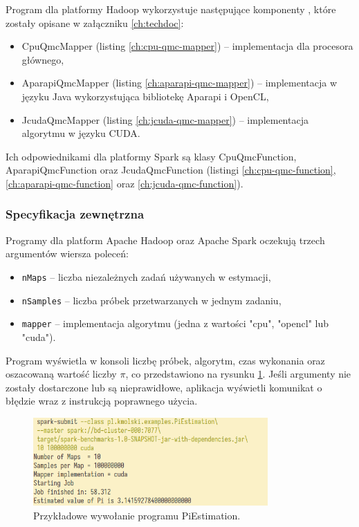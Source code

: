 Program dla platformy Hadoop wykorzystuje następujące komponenty ,
które zostały opisane w załączniku \ref{ch:techdoc}:
\begin{itemize}
	\item CpuQmcMapper (listing \ref{ch:cpu-qmc-mapper}) -- implementacja dla procesora głównego,
	\item AparapiQmcMapper (listing \ref{ch:aparapi-qmc-mapper}) -- implementacja w języku Java wykorzystująca bibliotekę Aparapi i OpenCL,
	\item JcudaQmcMapper (listing \ref{ch:jcuda-qmc-mapper}) -- implementacja algorytmu w języku CUDA.
\end{itemize}

Ich odpowiednikami dla platformy Spark są klasy CpuQmcFunction, AparapiQmcFunction oraz JcudaQmcFunction (listingi \ref{ch:cpu-qmc-function}, \ref{ch:aparapi-qmc-function} oraz
\ref{ch:jcuda-qmc-function}).

\subsubsection*{Specyfikacja zewnętrzna}

Programy dla platform Apache Hadoop oraz Apache Spark oczekują trzech argumentów wiersza poleceń:
\begin{itemize}
	\item \lstinline{nMaps} -- liczba niezależnych zadań używanych w estymacji,
	\item \lstinline{nSamples} -- liczba próbek przetwarzanych w jednym zadaniu,
	\item \lstinline{mapper} -- implementacja algorytmu (jedna z wartości "cpu", "opencl" lub "cuda").
\end{itemize}

Program wyświetla w konsoli liczbę próbek, algorytm, czas wykonania oraz oszacowaną wartość liczby $\pi$, co przedstawiono na rysunku \ref{fig:piestimation:run}.
Jeśli argumenty nie zostały dostarczone lub są nieprawidłowe, aplikacja wyświetli komunikat o
błędzie wraz z instrukcją poprawnego użycia.

\begin{figure}[h]
	\centering
	\includegraphics[width=0.8\textwidth]{graf/PiEstimation-interface.png}
	\caption{Przykładowe wywołanie programu PiEstimation.}
	\label{fig:piestimation:run}
\end{figure}

